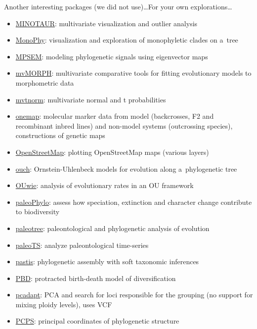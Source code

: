 \documentclass[compress, ucs, xelatex, 11pt, xcolor=svgnames, aspectratio=169,
	hyperref={
		bookmarks=true,
		unicode=true,
		colorlinks=true,
		pdftitle={Molecular data in R},
		plainpages=false,
		pdfauthor={Vojtech Zeisek},
		pdfsubject={Course about phylogeny and evolution in R},
		pdfcreator={XeLaTeX},
		pdfkeywords={R, evolution, phylogeny, molecular data},
		linkcolor=Crimson, %
		anchorcolor=Magenta, %
		citecolor=Magenta, %
		filecolor=Magenta, %
		menucolor=Magenta, %
		urlcolor=DodgerBlue, %
		pdftex},
	url={hyphens, lowtilde} %
	]{beamer}
\begin{document}
\begin{frame}[allowframebreaks]{Another interesting packages (we did not use)\ldots}{For your own explorations\ldots}
\begin{itemize}
		\item \href{https://github.com/NESCent/MINOTAUR}{MINOTAUR}: multivariate visualization and outlier analysis
		\item \href{https://CRAN.R-project.org/package=MonoPhy}{MonoPhy}: visualization and exploration of monophyletic clades on a~tree
		\item \href{https://CRAN.R-project.org/package=MPSEM}{MPSEM}: modeling phylogenetic signals using eigenvector maps
		\item \href{https://CRAN.R-project.org/package=mvMORPH}{mvMORPH}: multivariate comparative tools for fitting evolutionary models to morphometric data
		\item \href{https://CRAN.R-project.org/package=mvtnorm}{mvtnorm}: multivariate normal and t probabilities
		\item \href{https://CRAN.R-project.org/package=onemap}{onemap}: molecular marker data from model (backcrosses, F2 and recombinant inbred lines) and non-model systems (outcrossing species), constructions of genetic maps
		\item \href{https://CRAN.R-project.org/package=OpenStreetMap}{OpenStreetMap}: plotting OpenStreetMap maps (various layers)
		\item \href{https://CRAN.R-project.org/package=ouch}{ouch}: Ornstein-Uhlenbeck models for evolution along a~phylogenetic tree
		\item \href{https://CRAN.R-project.org/package=OUwie}{OUwie}: analysis of evolutionary rates in an OU framework
		\item \href{https://r-forge.r-project.org/projects/paleophylo/}{paleoPhylo}: assess how speciation, extinction and character change contribute to biodiversity
		\item \href{https://CRAN.R-project.org/package=paleotree}{paleotree}: paleontological and phylogenetic analysis of evolution
		\item \href{https://CRAN.R-project.org/package=paleoTS}{paleoTS}: analyze paleontological time-series
		\item \href{https://CRAN.R-project.org/package=pastis}{pastis}: phylogenetic assembly with soft taxonomic inferences
		\item \href{https://CRAN.R-project.org/package=PBD}{PBD}: protracted birth-death model of diversification
		\item \href{https://CRAN.R-project.org/package=pcadapt}{pcadapt}: PCA and search for loci responsible for the grouping (no support for mixing ploidy levels), uses VCF
		\item \href{https://CRAN.R-project.org/package=PCPS}{PCPS}: principal coordinates of phylogenetic structure

\end{itemize}
\end{frame}
\end{document}
